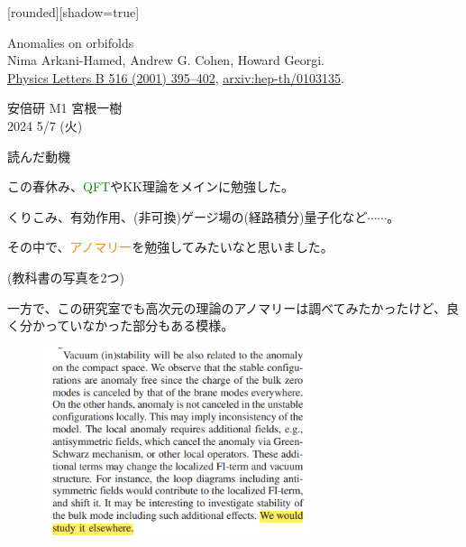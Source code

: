 \documentclass[
  unicode,a4paper,10pt,
  xcolor = {dvipsnames,svgnames},
  hyperref ={colorlinks=true,citecolor=Navy,linkcolor=NavyBlue,urlcolor=purple},
  ja=standard,lualatex
]{beamer}
\begin{document}
\nocite{Arkani-Hamed:2001uol}

\begin{frame}

  [rounded][shadow=true]
  \begin{block}{}
    \vspace*{5pt}

    \centering\Large
    Anomalies on orbifolds
    \\
    \normalsize
    Nima Arkani-Hamed, Andrew G. Cohen, Howard Georgi.
    \\
    \small
    \href{https://doi.org/10.1016/S0370-2693(01)00946-7}{Physics Letters B 516 (2001) 395–402},
    \href{https://doi.org/10.48550/arXiv.hep-th/0103135}{arxiv:hep-th/0103135}.

    \vspace*{5pt}
  \end{block}

  \begin{center}
    安倍研 M1 宮根一樹\\
    2024 5/7 (火)
  \end{center}
\end{frame}


\begin{frame}{読んだ動機}

  この春休み、\textcolor{Green}{QFT}やKK理論をメインに勉強した。

  \vspace*{5pt}
  
  くりこみ、有効作用、(非可換)ゲージ場の(経路積分)量子化など$\cdots\cdots$。

  \vspace*{5pt}
  \pause
  
  その中で、\textcolor{DarkOrange}{アノマリー}を勉強してみたいなと思いました。

  (教科書の写真を2つ)

\end{frame}


\begin{frame}

  一方で、この研究室でも高次元の理論のアノマリーは調べてみたかったけど、良く分かっていなかった部分もある模様。
  \begin{figure}[ht]
    \includegraphics[width=0.7\textwidth]{fig/Abe2020vmv.png}
    \cite{Abe:2020vmv}
  \end{figure}

\end{frame}
\end{document}
